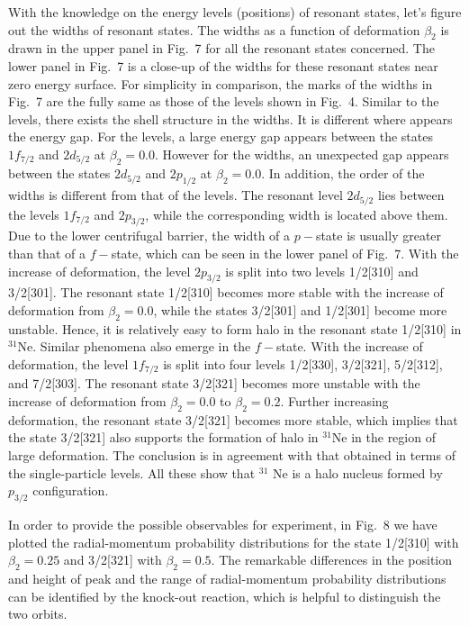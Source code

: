 \documentclass[twocolumn,prc,showpacs,preprintnumbers,superscriptaddress,floatfix]{revtex4}
\begin{document}
With the knowledge on the energy levels (positions) of resonant states,
let's figure out the widths of resonant states. The widths as a function of
deformation $\beta _{2}$ is drawn in the upper panel in Fig.~7 for all the
resonant states concerned. The lower panel in Fig.~7 is a close-up of the
widths for these resonant states near zero energy surface. For simplicity in
comparison, the marks of the widths in Fig.~7 are the fully same as those of
the levels shown in Fig.~4. Similar to the levels, there exists the shell
structure in the widths. It is different where appears the energy gap. For
the levels, a large energy gap appears between the states $1f_{7/2}$ and $%
2d_{5/2}$ at $\beta _{2}=0.0$. However for the widths, an unexpected gap
appears between the states $2d_{5/2}$ and $2p_{1/2}$ at $\beta _{2}=0.0$. In
addition, the order of the widths is different from that of the levels. The
resonant level $2d_{5/2}$ lies between the levels $1f_{7/2}$ and $2p_{3/2}$,
while the corresponding width is located above them. Due to the lower
centrifugal barrier, the width of a $p-$state is usually greater than that
of a $f-$state, which can be seen in the lower panel of Fig.~7. With the
increase of deformation, the level $2p_{3/2}$ is split into two levels
1/2[310] and 3/2[301]. The resonant state 1/2[310] becomes more stable with
the increase of deformation from $\beta _{2}=0.0$, while the states 3/2[301]
and 1/2[301] become more unstable. Hence, it is relatively easy to form halo
in the resonant state 1/2[310] in $^{31}$Ne. Similar phenomena also emerge
in the $f-$state. With the increase of deformation, the level $1f_{7/2}$ is
split into four levels 1/2[330], 3/2[321], 5/2[312], and 7/2[303]. The
resonant state 3/2[321] becomes more unstable with the increase of
deformation from $\beta _{2}=0.0$ to $\beta _{2}=0.2$. Further increasing
deformation, the resonant state 3/2[321] becomes more stable, which implies
that the state 3/2[321] also supports the formation of halo in $^{31}$Ne in
the region of large deformation. The conclusion is in agreement with that
obtained in terms of the single-particle levels. All these show that $^{31}$%
Ne is a halo nucleus formed by $p_{3/2}$ configuration.

In order to provide the possible observables for experiment, in Fig.~8 we have plotted the radial-momentum probability distributions for the state 1/2[310] with $\beta_2=0.25$ and 3/2[321] with $\beta_2=0.5$. The remarkable differences in the position and height of peak and the range of radial-momentum probability distributions can be identified by the knock-out reaction, which is helpful to distinguish the two orbits.
\end{document}
